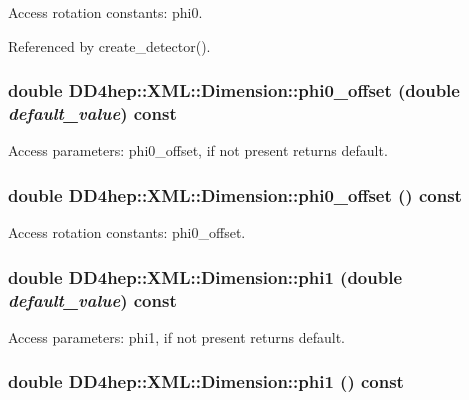 Access rotation constants: phi0. 

Referenced by create\_\-detector().\hypertarget{struct_d_d4hep_1_1_x_m_l_1_1_dimension_af9fe8ef5b72222a849c0b16494c22b30}{
\subsubsection[{phi0\_\-offset}]{\setlength{\rightskip}{0pt plus 5cm}double DD4hep::XML::Dimension::phi0\_\-offset (double {\em default\_\-value}) const}}
\label{struct_d_d4hep_1_1_x_m_l_1_1_dimension_af9fe8ef5b72222a849c0b16494c22b30}


Access parameters: phi0\_\-offset, if not present returns default. \hypertarget{struct_d_d4hep_1_1_x_m_l_1_1_dimension_ac4819fb6e7e65e77f55a86058ead1bad}{
\subsubsection[{phi0\_\-offset}]{\setlength{\rightskip}{0pt plus 5cm}double DD4hep::XML::Dimension::phi0\_\-offset () const}}
\label{struct_d_d4hep_1_1_x_m_l_1_1_dimension_ac4819fb6e7e65e77f55a86058ead1bad}


Access rotation constants: phi0\_\-offset. \hypertarget{struct_d_d4hep_1_1_x_m_l_1_1_dimension_a0cc5f00cea8888e2f5f774d2172c82ff}{
\subsubsection[{phi1}]{\setlength{\rightskip}{0pt plus 5cm}double DD4hep::XML::Dimension::phi1 (double {\em default\_\-value}) const}}
\label{struct_d_d4hep_1_1_x_m_l_1_1_dimension_a0cc5f00cea8888e2f5f774d2172c82ff}


Access parameters: phi1, if not present returns default. \hypertarget{struct_d_d4hep_1_1_x_m_l_1_1_dimension_a96357d042353b360e9b8778f8bd237cd}{
\subsubsection[{phi1}]{\setlength{\rightskip}{0pt plus 5cm}double DD4hep::XML::Dimension::phi1 () const}}
\label{struct_d_d4hep_1_1_x_m_l_1_1_dimension_a96357d042353b360e9b8778f8bd237cd}


